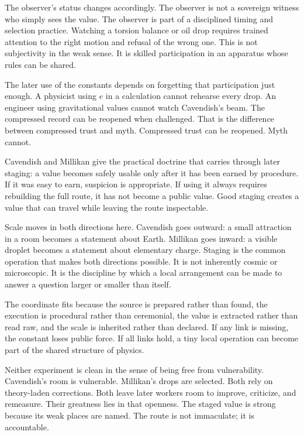 The observer's status changes accordingly. The observer is not a sovereign
witness who simply sees the value. The observer is part of a disciplined
timing and selection practice. Watching a torsion balance or oil drop
requires trained attention to the right motion and refusal of the wrong one.
This is not subjectivity in the weak sense. It is skilled participation in
an apparatus whose rules can be shared.

The later use of the constants depends on forgetting that participation just
enough. A physicist using \(e\) in a calculation cannot rehearse every drop.
An engineer using gravitational values cannot watch Cavendish's beam. The
compressed record can be reopened when challenged. That is the difference
between compressed trust and myth. Compressed trust can be reopened. Myth
cannot.

Cavendish and Millikan give the practical doctrine that carries through
later staging: a value becomes safely usable only after it has been earned
by procedure. If it was easy to earn, suspicion is appropriate. If using it
always requires rebuilding the full route, it has not become a public value.
Good staging creates a value that can travel while leaving the route
inspectable.

Scale moves in both directions here. Cavendish goes outward: a small
attraction in a room becomes a statement about Earth. Millikan goes inward:
a visible droplet becomes a statement about elementary charge. Staging is
the common operation that makes both directions possible. It is not
inherently cosmic or microscopic. It is the discipline by which a local
arrangement can be made to answer a question larger or smaller than itself.

The coordinate  fits because the
source is prepared rather than found, the execution is procedural rather
than ceremonial, the value is extracted rather than read raw, and the scale
is inherited rather than declared. If any link is missing, the constant
loses public force. If all links hold, a tiny local operation can become
part of the shared structure of physics.

Neither experiment is clean in the sense of being free from vulnerability. Cavendish's room is
vulnerable. Millikan's drops are selected. Both rely on theory-laden
corrections. Both leave later workers room to improve, criticize, and
remeasure. Their greatness lies in that openness. The staged value is
strong because its weak places are named. The route is not immaculate; it
is accountable.

